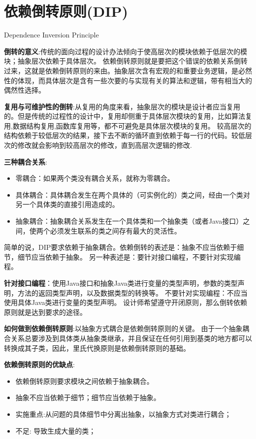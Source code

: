 \documentclass[../main.tex]{subfiles}
\begin{document}
\section{依赖倒转原则(DIP)}
Dependence Inversion Principle

\textbf{倒转的意义}:传统的面向过程的设计办法倾向于使高层次的模块依赖于低层次的模块；抽象层次依赖于具体层次。
依赖倒转原则就是要把这个错误的依赖关系倒转过来，这就是依赖倒转原则的来由。抽象层次含有宏观的和重要业务逻辑，是必然性的体现，而具体层次是含有一些次要的与实现有关的算法和逻辑，带有相当大的偶然性选择。

\textbf{复用与可维护性的倒转}:从复用的角度来看，抽象层次的模块是设计者应当复用的。但是传统的过程性的设计中，复用却侧重于具体层次模块的复用，比如算法复用,数据结构复用,函数库复用等，都不可避免是具体层次模块的复用。
较高层次的结构依赖于较低层次的结果，接下去不断的循环直到依赖于每一行的代码。较低层次的修改就会影响到较高层次的修改，直到高层次逻辑的修改.

\textbf{三种耦合关系}:
\begin{itemize}
  \item 零耦合：如果两个类没有耦合关系，就称为零耦合。
  \item 具体耦合：具体耦合发生在两个具体的（可实例化的）类之间，经由一个类对另一个具体类的直接引用造成的。
  \item 抽象耦合：抽象耦合关系发生在一个具体类和一个抽象类（或者Java接口）之间，使两个必须发生联系的类之间存有最大的灵活性。
\end{itemize}
\noindent 简单的说，DIP要求依赖于抽象耦合。依赖倒转的表述是：抽象不应当依赖于细节，细节应当依赖于抽象。
另一种表述是：要针对接口编程，不要针对实现编程。

\noindent \textbf{针对接口编程}：使用Java接口和抽象Java类进行变量的类型声明，参数的类型声明，方法的返回类型声明，以及数据类型的转换等。
不要针对实现编程：不应当使用具体Java类进行变量的类型声明。
设计师希望遵守开闭原则，那么倒转依赖原则就是达到要求的途径。

\textbf{如何做到依赖倒转原则}:以抽象方式耦合是依赖倒转原则的关键。
由于一个抽象耦合关系总要涉及到具体类从抽象类继承，并且保证在任何引用到基类的地方都可以转换成其子类，因此，里氏代换原则是依赖倒转原则的基础。

\textbf{依赖倒转原则的优缺点}:
\begin{itemize}
  \item 依赖倒转原则要求模块之间依赖于抽象耦合。
  \item 抽象不应当依赖于细节；细节应当依赖于抽象。
  \item 实施重点:从问题的具体细节中分离出抽象，以抽象方式对类进行耦合；
  \item 不足: 导致生成大量的类；
\end{itemize}
\end{document}
